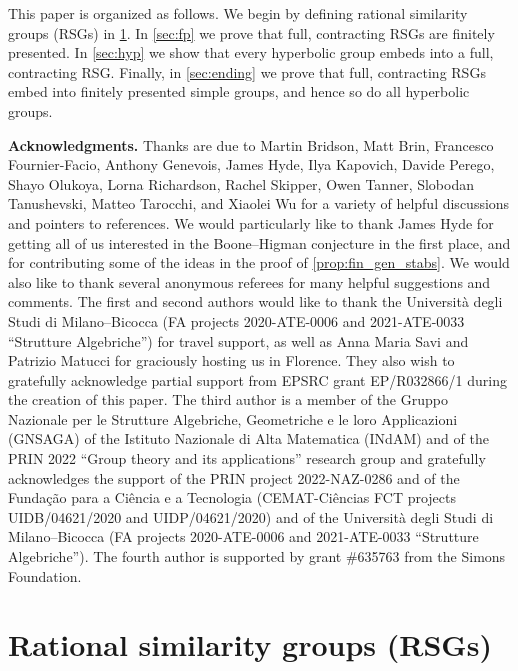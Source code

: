 \documentclass[11pt,letterpaper]{amsart}
\theoremstyle{definition}
\begin{document}
\medskip

This paper is organized as follows. We begin by defining rational similarity groups (RSGs) in \cref{sec:the_groups}. In \cref{sec:fp} we prove that full, contracting RSGs are finitely presented. In \cref{sec:hyp} we show that every hyperbolic group embeds into a full, contracting RSG. Finally, in \cref{sec:ending} we prove that full, contracting RSGs embed into finitely presented simple groups, and hence so do all hyperbolic groups.

\medskip

\noindent\textbf{Acknowledgments.} Thanks are due to Martin Bridson, Matt Brin, Francesco Fournier-Facio, Anthony Genevois, James Hyde, Ilya Kapovich, Davide Perego, Shayo Olukoya, Lorna Richardson, Rachel Skipper, Owen Tanner, Slobodan Tanushevski, Matteo Tarocchi, and Xiaolei Wu for a variety of helpful discussions and pointers to references. We would particularly like to thank James Hyde for getting all of us interested in the Boone--Higman conjecture in the first place, and for contributing some of the ideas in the proof of \cref{prop:fin_gen_stabs}. We would also like to thank several anonymous referees for many helpful suggestions and comments. The first and second authors would like to thank the Universit\`a degli Studi di Milano--Bicocca (FA projects 2020-ATE-0006 and 2021-ATE-0033 ``Strutture Algebriche'') for travel support, as well as Anna Maria Savi and Patrizio Matucci for graciously hosting us in Florence.  They also wish to gratefully acknowledge partial support from EPSRC grant EP/R032866/1 during the creation of this paper. The third author is a member of the Gruppo Nazionale per le Strutture Algebriche, Geometriche e le loro Applicazioni (GNSAGA) of the Istituto Nazionale di Alta Matematica (INdAM) and of the PRIN 2022 ``Group theory and its applications'' research group and gratefully acknowledges the support of the PRIN project 2022-NAZ-0286 and of the Funda\c{c}\~ao para a Ci\^encia e a Tecnologia  (CEMAT-Ci\^encias FCT projects UIDB/04621/2020 and UIDP/04621/2020) and of the Universit\`a degli Studi di Milano--Bicocca (FA projects 2020-ATE-0006 and 2021-ATE-0033 ``Strutture Algebriche''). The fourth author is supported by grant \#635763 from the Simons Foundation.



\section{Rational similarity groups (RSGs)}\label{sec:the_groups}
\end{document}
